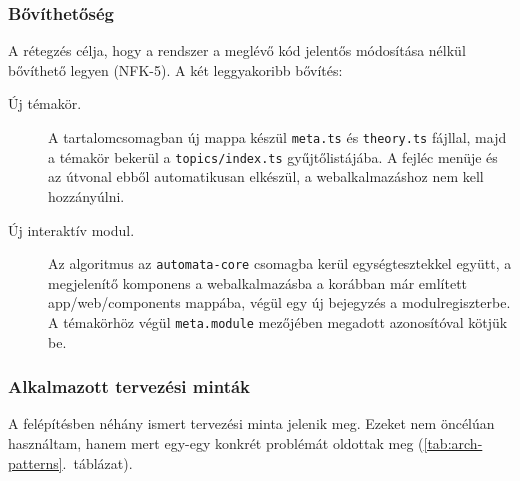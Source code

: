 \subsubsection{Bővíthetőség}

A rétegzés célja, hogy a rendszer a meglévő kód jelentős módosítása
nélkül bővíthető legyen (NFK-5). A két leggyakoribb bővítés:

\begin{description}
    \item[Új témakör.] A tartalomcsomagban új mappa készül
          \texttt{meta.ts} és \texttt{theory.ts} fájllal, majd a témakör
          bekerül a \texttt{topics/index.ts} gyűjtőlistájába. A fejléc
          menüje és az útvonal ebből automatikusan elkészül, a
          webalkalmazáshoz nem kell hozzányúlni.
    \item[Új interaktív modul.] Az algoritmus az \texttt{automata-core}
          csomagba kerül egységtesztekkel együtt, a megjelenítő komponens a
          webalkalmazásba a korábban már említett app/web/components mappába,
           végül egy új bejegyzés a modulregiszterbe. A
          témakörhöz végül \texttt{meta.module} mezőjében megadott azonosítóval kötjük be.
\end{description}

\subsubsection{Alkalmazott tervezési minták}

A felépítésben néhány ismert tervezési minta jelenik meg. Ezeket nem
öncélúan használtam, hanem mert egy-egy konkrét problémát oldottak meg
(\ref{tab:arch-patterns}.~táblázat).

